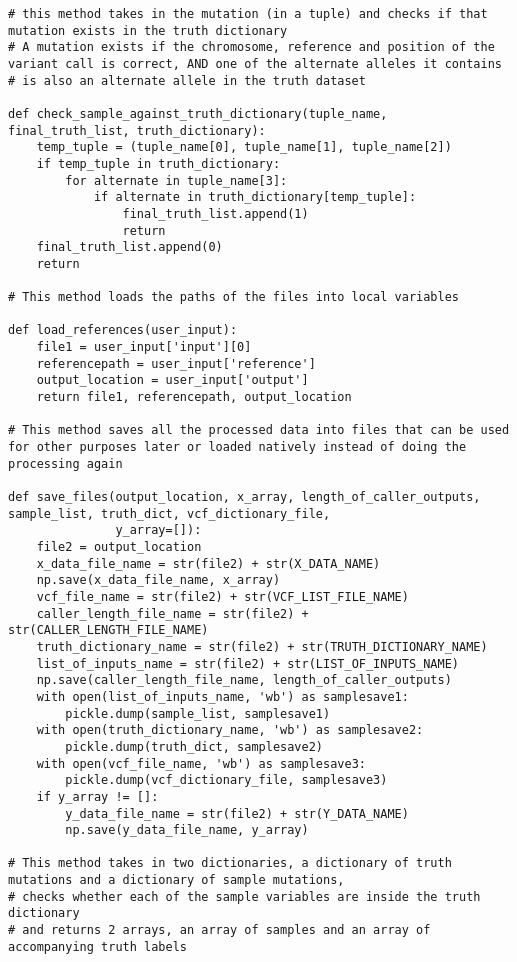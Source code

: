 \documentclass{article}
\begin{document}
\begin{verbatim}
# this method takes in the mutation (in a tuple) and checks if that mutation exists in the truth dictionary
# A mutation exists if the chromosome, reference and position of the variant call is correct, AND one of the alternate alleles it contains
# is also an alternate allele in the truth dataset
	
def check_sample_against_truth_dictionary(tuple_name, final_truth_list, truth_dictionary):
    temp_tuple = (tuple_name[0], tuple_name[1], tuple_name[2])
    if temp_tuple in truth_dictionary:
        for alternate in tuple_name[3]:
            if alternate in truth_dictionary[temp_tuple]:
                final_truth_list.append(1)
                return
    final_truth_list.append(0)
    return

# This method loads the paths of the files into local variables

def load_references(user_input):
    file1 = user_input['input'][0]
    referencepath = user_input['reference']
    output_location = user_input['output']
    return file1, referencepath, output_location

# This method saves all the processed data into files that can be used for other purposes later or loaded natively instead of doing the processing again

def save_files(output_location, x_array, length_of_caller_outputs, sample_list, truth_dict, vcf_dictionary_file,
               y_array=[]):
    file2 = output_location
    x_data_file_name = str(file2) + str(X_DATA_NAME)
    np.save(x_data_file_name, x_array)
    vcf_file_name = str(file2) + str(VCF_LIST_FILE_NAME)
    caller_length_file_name = str(file2) + str(CALLER_LENGTH_FILE_NAME)
    truth_dictionary_name = str(file2) + str(TRUTH_DICTIONARY_NAME)
    list_of_inputs_name = str(file2) + str(LIST_OF_INPUTS_NAME)
    np.save(caller_length_file_name, length_of_caller_outputs)
    with open(list_of_inputs_name, 'wb') as samplesave1:
        pickle.dump(sample_list, samplesave1)
    with open(truth_dictionary_name, 'wb') as samplesave2:
        pickle.dump(truth_dict, samplesave2)
    with open(vcf_file_name, 'wb') as samplesave3:
        pickle.dump(vcf_dictionary_file, samplesave3)
    if y_array != []:
        y_data_file_name = str(file2) + str(Y_DATA_NAME)
        np.save(y_data_file_name, y_array)

# This method takes in two dictionaries, a dictionary of truth mutations and a dictionary of sample mutations, 
# checks whether each of the sample variables are inside the truth dictionary
# and returns 2 arrays, an array of samples and an array of accompanying truth labels
		

\end{verbatim}
\end{document}
